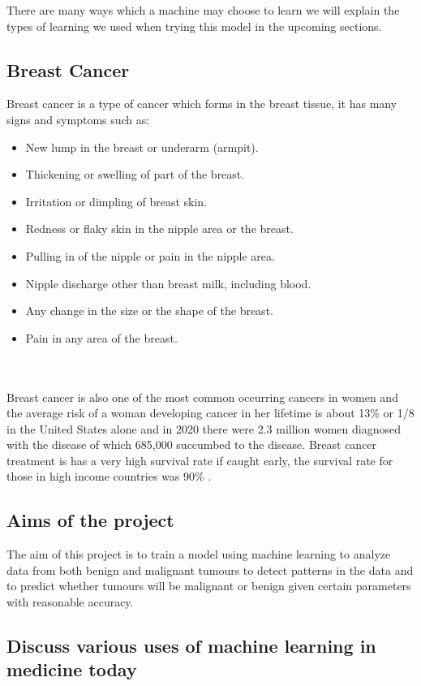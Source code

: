 \documentclass[conference]{IEEEtran}
\begin{document}
There are many ways which a machine may choose to learn we will explain the types of learning we used when trying this model in the upcoming sections.  
\subsection{Breast Cancer}
Breast cancer is a type of cancer which forms in the breast tissue, it has many signs and symptoms such as: 
\begin{itemize}
    \item New lump in the breast or underarm (armpit).
    \item Thickening or swelling of part of the breast.
    \item Irritation or dimpling of breast skin.
    \item Redness or flaky skin in the nipple area or the breast.
    \item Pulling in of the nipple or pain in the nipple area.
    \item Nipple discharge other than breast milk, including blood.
    \item Any change in the size or the shape of the breast.
    \item Pain in any area of the breast.
\end{itemize} \cite{symptomsofbreastcancer}
\\
\\
Breast cancer is also one of the most common occurring cancers in women and the average risk of a woman developing cancer in her lifetime is about 13\% or 1/8 in the United States alone\cite{howcommonisbreastcancer} and in 2020 there were 2.3 million women diagnosed with the disease of which 685,000 succumbed to the disease\cite{breastcancerstatistics}.  Breast cancer treatment is has a very high survival rate if caught early, the survival rate for those in high income countries was 90\% \cite{breastcancerstatistics}.
\subsection{Aims of the project}
 The aim of this project is to train a model using machine learning to analyze data from both benign and malignant tumours to detect patterns in the data and to predict whether tumours will be malignant or benign given certain parameters with reasonable accuracy.
\subsection{Discuss various uses of machine learning in medicine today}
\end{document}
